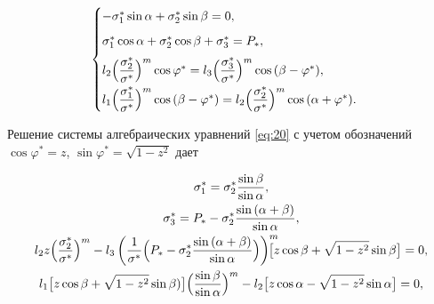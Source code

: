 \begin{equation}

\label{eq:20}

\begin{cases}

-\sigma_1^{\ast} \sin{\alpha} + \sigma_2^{\ast} \sin{\beta} = 0,\\[2mm]

\sigma_1^{\ast} \cos{\alpha} + \sigma_2^{\ast} \cos{\beta} + \sigma_3^{\ast} = P_\ast, \\[2mm]

l_2 \Bigl( \dfrac{\sigma_2^{\ast}}{\sigma^{\ast}} \Bigr)^m \cos{\varphi^{\ast}} = 

l_3 \Bigl( \dfrac{\sigma_3^{\ast}}{\sigma^{\ast}} \Bigr)^m \cos{(\beta-\varphi^{\ast})}, \\[2mm]

l_1 \Bigl( \dfrac{\sigma_1^{\ast}}{\sigma^{\ast}}\Bigr)^m \cos{(\beta-\varphi^{\ast})} = l_2 

\Bigl( \dfrac{\sigma_2^{\ast}}{\sigma^{\ast}} \Bigr)^m \cos{(\alpha+\varphi^{\ast})}.

\end{cases}

\end{equation}



Решение системы алгебраических уравнений \eqref{eq:20} с учетом обозначений $\cos \varphi^{\ast}=z$, $\sin{\varphi^{\ast} = \sqrt{1-z^2}}$ дает

\begin{gather}

\label{eq:21}

\sigma_{1}^{\ast}= \sigma_{2}^{\ast} \frac{\sin{\beta}}{\sin{\alpha}},

\\

\label{eq:22}

\sigma_{3}^{\ast} = P_\ast - \sigma_{2}^{\ast} \frac{\sin{(\alpha+\beta})}{\sin{\alpha}},

\\

\label{eq:23}

l_2 z \Bigl( \frac{\sigma_2^{\ast}}{\sigma^{\ast}} \Bigr)^m - 

l_3 \left( \frac{1}{\sigma^{\ast}} \Bigl(  P_\ast - \sigma_2^{\ast} \frac{\sin{(\alpha+\beta)}}{\sin{\alpha}} \Bigr) \right)^m \!\! \!\!\!\! \bigl[ z \cos{\beta} + \sqrt{1-z^2} \sin{\beta} \bigr] = 0,

\\

\label{eq:24}

l_1 \bigl[ z \cos{\beta} + \sqrt{1-z^2} \sin{\beta}) \bigr] \Bigl( \frac{\sin{\beta}}{\sin{\alpha}}  \Bigr)^m - l_2 \bigl[ z \cos{\alpha} - \sqrt{1-z^2} \sin{\alpha} \bigr] = 0,

\end{gather}

